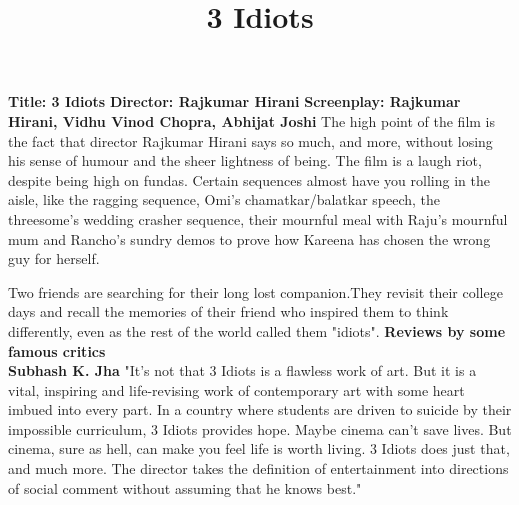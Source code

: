 \documentclass[10.5pt, a4paper]{article}
\title{3 Idiots}
\begin{document}
\maketitle
\textbf{Title: 3 Idiots}
\textbf{Director: Rajkumar Hirani}
\textbf{Screenplay: Rajkumar Hirani, Vidhu Vinod Chopra, Abhijat Joshi}
The high point of the film is the fact that director Rajkumar Hirani says so much, and more, without losing his sense of humour and the sheer lightness of being. The film is a laugh riot, despite being high on fundas. Certain sequences almost have you rolling in the aisle, like the ragging sequence, Omi's chamatkar/balatkar speech, the threesome's wedding crasher sequence, their mournful meal with Raju's mournful mum and Rancho's sundry demos to prove how Kareena has chosen the wrong guy for herself.

Two friends are searching for their long lost companion.They revisit their college days 
and recall the memories of their friend who inspired them to think differently, 
even as the rest of the world called them "idiots". 
\textbf{Reviews by some famous critics}\\
\textbf{Subhash K. Jha }
"It's not that 3 Idiots is a flawless work of art. But it is a vital, inspiring and life-revising work of contemporary art with some heart imbued into every part. In a country where students are driven to suicide by their impossible curriculum, 3 Idiots provides hope. Maybe cinema can't save lives. But cinema, sure as hell, can make you feel life is worth living. 3 Idiots does just that, and much more. The director takes the definition of entertainment into directions of social comment without assuming that he knows best."
\end{document}
